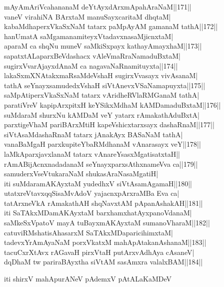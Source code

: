 \documentclass{article}
\begin{document}
mAyAmAriVcahananaM deYtAyxdArxmApahAraNaM||171||\\
vaneV virahiNA BArxtaM manuSayxcaritaM dhqtaM|\\
kabaMdhaperxVkaSxNaM tatarx paMpAyAM gamanaM tathA||172||\\
hanUmatA saMgamanamiteyxVtadavxnasaMjicnxtaM|\\
aparaM ca shqNu muneV saMkiSxpayx kathayAmayxhaM||173||\\
sapatxtALaparxBeVdashacx vAleVmaRraNamaduBxtaM|\\
sugirxVvarAjayxdAnaM ca nagavaNaRnamituyxta||174||\\
lakaSxmXNAtakxmaRsaMdeVshaH sugirxVvasayx vivAsanaM|\\
tathA seYnayxsamudedxVshaH siVtAnevxVSaNamapuyxta||175||\\
saMpAtiperxVkaSxNaM tatarx vAridheRVlaRMGanaM tathA|\\
paratiVreV kapipArxpitxH keYSikxMdhaM kAMDamaduBxtaM||176||\\
suMdaraM shurxNu kAMDaM veY yatarx rAmakathAduBxtA|\\
parxtigeVhaM pariBArxMtiH kapeVshicxtarxsayx dashaRnaM||177||\\
siVtAsaMdashaRnaM tatarx jAnakAyx BASaNaM tathA|\\
vanaBaMgaH parxkupiteYbaRMdhanaM vAnarasayx veY||178||\\
laMkAparxjavxlanaM tatarx vAnareYsasxMgatisatxtaH||\\
rAmABijAcnxnadadanaM seYnayxparxsAthxnameVva ca||179||\\
samuderxVseVtukaraNaM shukasAraNasaMgatiH|\\
iti suMdaramAKAyxtaM yudedhxV siVtAsamAgamaH||180||\\
utatxreVtavxqqSisaMvAdoV yajacnxpArxraMBa Eva ca|\\
tatArxneVkA rAmakathAH shqNavxtAM pApanAshakAH||181||\\
iti SaTAkxMDamAKAyxtaM barxhamxhatAyxpanoVdanaM|\\
saMkeSxVpatoV mayA tuBayxmAKAyxtaM sumanoVharaM||182||\\
catuviRMshatisAhasarxM SaTAkxMDaparicihimxtaM|\\
tadevxYrAmAyaNaM porxVkatxM mahApAtakanAshanaM||183||\\
tacuCxrXtAvx rAGavaH pirxVtaH putArxvAdhAya cAsaneV|\\
dqDhaM tw pariraBAyxtha siVtAM sasAmxra valalxBAM||184||\\

\begin{center}
iti shirxV mahApurANeV pAdemxV pAtALaKaMDeV
\end{center}
\end{document}
